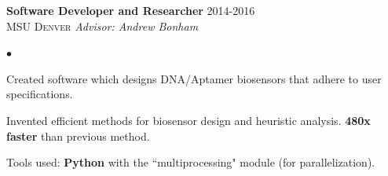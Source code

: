 \documentclass{article}
\newcommand{\experience}[4]{{\vspace{0pt}\bf{#1}} \hfill  #2\\{\textsc{#3} \hfill \emph{#4}\\  }}
\newenvironment{achievements}{\begin{list}{$\bullet$}{\topsep 0pt \itemsep -2pt}}{\vspace*{4pt}\end{list}}
\begin{document}
	


	
	

    
\experience{Software Developer and Researcher}{2014-2016}{MSU Denver}{Advisor: Andrew Bonham}
\begin{achievements}
    \item Created software which designs DNA/Aptamer biosensors that adhere to user specifications.
    \item Invented efficient methods for biosensor design and heuristic analysis. \textbf{480x faster} than previous method.
    \item Tools used: \textbf{Python} with the ``multiprocessing" module (for parallelization).
\end{achievements}


\end{document}
